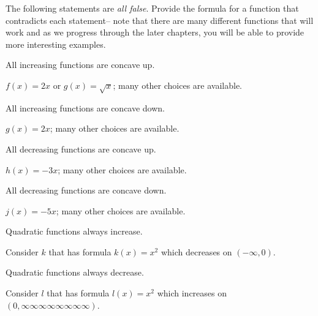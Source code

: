 \begin{exercises}
\begin{problem}
The following statements are \emph{all false}. Provide the formula 
for a function that contradicts each statement-- note that there are 
many different functions that will work and as we progress through 
the later chapters, you will be able to provide more interesting 
examples.
\begin{subproblem}
	All increasing functions are concave up.  
	\begin{shortsolution}
		$f(x)=2x$ or $g(x)=\sqrt{x}$; many other choices are available.
	\end{shortsolution}
\end{subproblem}
\begin{subproblem}
	All increasing functions are concave down.  
	\begin{shortsolution}
		$g(x)=2x$; many other choices are available.  
	\end{shortsolution}
\end{subproblem}
\begin{subproblem}
	All decreasing functions are concave up.  
	\begin{shortsolution}
		$h(x)=-3x$; many other choices are available.
	\end{shortsolution}
\end{subproblem}
\begin{subproblem}
	All decreasing functions are concave down.  
	\begin{shortsolution}
		$j(x)=-5x$; many other choices are available.  
	\end{shortsolution}
\end{subproblem}
\begin{subproblem}
	Quadratic functions always increase. 
	\begin{shortsolution}
		Consider $k$ that has formula $k(x)=x^2$ which decreases on $(-\infty,0)$.  
	\end{shortsolution}
\end{subproblem}
\begin{subproblem}
	Quadratic functions always decrease.  
	\begin{shortsolution}
		Consider $l$ that has formula $l(x)=x^2$ which increases on $(0,\infty\infty\infty\infty\infty\infty\infty\infty)$.  
	\end{shortsolution}
\end{subproblem}
\end{problem}
\end{exercises}


